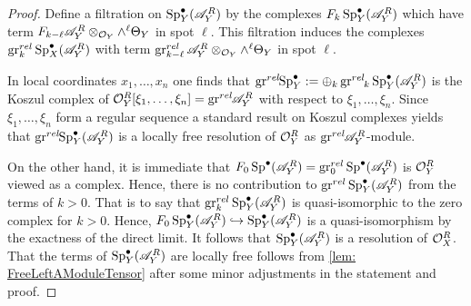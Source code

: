     \begin{proof}
      Define a filtration on $\operatorname{Sp}_Y^\bullet(\mathscr{A}_Y^R)$ by the complexes $F_k\operatorname{Sp}_Y^\bullet(\mathscr{A}_Y^R)$ which have term $F_{k-\ell}\mathscr{A}_Y^R\otimes_{\mathcal{O}_Y}\wedge^\ell \Theta_Y$ in spot $\ell$.
      This filtration induces the complexes $\operatorname{gr}_k^{rel} \operatorname{Sp}_X^\bullet(\mathscr{A}_Y^R)$ with term  $\operatorname{gr}_{k-\ell}^{rel}\mathscr{A}_Y^R\otimes_{\mathcal{O}_Y}\wedge^\ell \Theta_Y$ in spot $\ell$.

      In local coordinates $x_1,\ldots, x_n$ one finds that $\operatorname{gr}^{rel}\mkern-5mu\operatorname{Sp}_Y^\bullet := \oplus_k \operatorname{gr}^{rel}\mkern-5mu_k \operatorname{Sp}_Y^\bullet(\mathscr{A}_Y^R)$ is the Koszul complex of $\mathcal{O}_Y^R[\xi_1,\ldots,\xi_n] = \operatorname{gr}^{rel}\mkern-5mu \mathscr{A}_Y^R$ with respect to  $\xi_1,\ldots, \xi_n$.
      Since $\xi_1,\ldots,\xi_n$ form a regular sequence a standard result on Koszul complexes yields that $\operatorname{gr}^{rel}\mkern-5mu\operatorname{Sp}_Y^\bullet(\mathscr{A}_Y^R)$ is a locally free resolution of $\mathcal{O}_Y^R$ as $\operatorname{gr}^{rel}\mkern-5mu \mathscr{A}_Y^R$-module.

      On the other hand, it is immediate that $F_0 \operatorname{Sp}^\bullet(\mathscr{A}_Y^R) = \operatorname{gr}_0^{rel}\operatorname{Sp}^\bullet(\mathscr{A}_Y^R)$ is  $\mathcal{O}_Y^R$ viewed as a complex. Hence, there is no contribution to $\operatorname{gr}^{rel}\operatorname{Sp}_Y^\bullet(\mathscr{A}_Y^R)$ from the terms of $k>0$.
      That is to say that $\operatorname{gr}_k^{rel}\operatorname{Sp}_Y^\bullet(\mathscr{A}_Y^R)$ is quasi-isomorphic to the zero complex for $k>0$.
      Hence, $F_0\operatorname{Sp}_Y^\bullet(\mathscr{A}_Y^R)\hookrightarrow \operatorname{Sp}_Y^\bullet(\mathscr{A}_Y^R)$ is a quasi-isomorphism by the exactness of the direct limit.
      It follows that  $\operatorname{Sp}_Y^\bullet(\mathscr{A}_Y^R)$ is a resolution of $\mathcal{O}_X^R$.
      That the terms of $\operatorname{Sp}_Y^\bullet(\mathscr{A}_Y^R)$ are locally free follows from \cref{lem: FreeLeftAModuleTensor} after some minor adjustments in the statement and proof.
    \end{proof}

